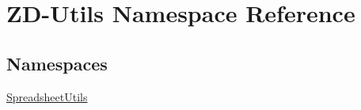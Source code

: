\hypertarget{namespace_z_d-_utils}{\section{Z\-D-\/\-Utils Namespace Reference}
\label{namespace_z_d-_utils}
}
\subsection*{Namespaces}
\begin{DoxyCompactItemize}
\item 
\hyperlink{namespace_z_d-_utils_1_1_spreadsheet_utils}{Spreadsheet\-Utils}
\end{DoxyCompactItemize}
